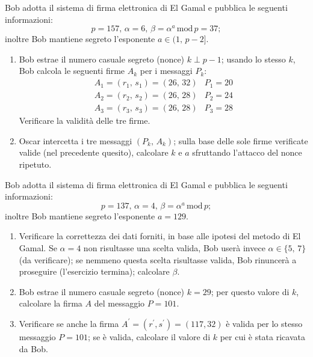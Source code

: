         Bob adotta il sistema di firma elettronica di El Gamal e pubblica le seguenti informazioni: \[
            p=157,\, \alpha = 6,\, \beta = \alpha^a\,\mathrm{mod}\,p=37
        ;\] inoltre Bob mantiene segreto l'esponente $a\in (1,\,p-2]$.
        \begin{enumerate}
            \item Bob estrae il numero casuale segreto (nonce) $k\perp p-1$; usando lo stesso $k$, 
                Bob calcola le seguenti firme $A_k$ per i messaggi $P_k$:
                \[\begin{array}{ll}
                    A_1=(r_1,\,s_1)=(26,\,32) & P_1=20\\
                    A_2=(r_2,\,s_2)=(26,\,28) & P_2=24\\
                    A_3=(r_3,\,s_3)=(26,\,28) & P_3=28
                \end{array}\]
                Verificare la validità delle tre firme.
            \item Oscar intercetta i tre messaggi $(P_k,\,A_k)$; sulla base delle sole firme verificate valide 
                (nel precedente quesito), calcolare $k$ e $a$ sfruttando l'attacco del nonce ripetuto.
        \end{enumerate}

        Bob adotta il sistema di firma elettronica di El Gamal e pubblica le seguenti informazioni: \[
            p=137,\, \alpha = 4,\, \beta = \alpha^a\,\mathrm{mod}\,p
        ;\] inoltre Bob mantiene segreto l'esponente $a=129$.
        \begin{enumerate}
            \item Verificare la correttezza dei dati forniti, in base alle ipotesi del metodo di El Gamal. 
                Se $\alpha=4$ non risultasse una scelta valida, Bob userà invece $\alpha\in \{5,\,7\}$ 
                (da verificare); se nemmeno questa scelta risultasse valida, Bob rinuncerà a proseguire 
                (l'esercizio termina); calcolare $\beta$.
            \item Bob estrae il numero casuale segreto (nonce) $k=29$; per questo valore di $k$, calcolare 
                la firma $A$ del messaggio $P=101$.
            \item Verificare se anche la firma $A^{\prime}=(r^{\prime}, s^{\prime})=(117,32)$ è valida per 
                lo stesso messaggio $P=101$; se è valida, calcolare il valore di $k$ per cui è stata ricavata da Bob.
        \end{enumerate}

